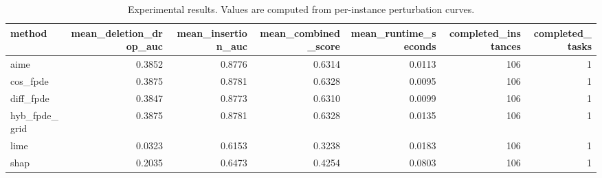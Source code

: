 \begin{table}[t]
\caption{Experimental results. Values are computed from per-instance perturbation curves.}
\label{tab:main_results_computed}
\centering
\begin{tabular}{lrrrrrr}
\toprule
method & mean\_deletion\_drop\_auc & mean\_insertion\_auc & mean\_combined\_score & mean\_runtime\_seconds & completed\_instances & completed\_tasks \\
\midrule
aime & 0.3852 & 0.8776 & 0.6314 & 0.0113 & 106 & 1 \\
cos\_fpde & 0.3875 & 0.8781 & 0.6328 & 0.0095 & 106 & 1 \\
diff\_fpde & 0.3847 & 0.8773 & 0.6310 & 0.0099 & 106 & 1 \\
hyb\_fpde\_grid & 0.3875 & 0.8781 & 0.6328 & 0.0135 & 106 & 1 \\
lime & 0.0323 & 0.6153 & 0.3238 & 0.0183 & 106 & 1 \\
shap & 0.2035 & 0.6473 & 0.4254 & 0.0803 & 106 & 1 \\
\bottomrule
\end{tabular}

\end{table}
